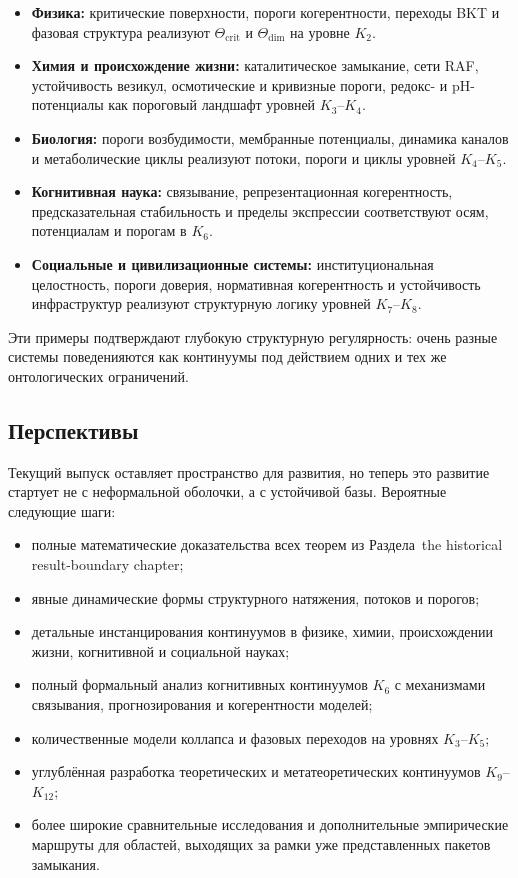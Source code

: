 \begin{itemize}
    \item \textbf{Физика:} критические поверхности, пороги когерентности, переходы BKT и
          фазовая структура реализуют \(\Theta_{\mathrm{crit}}\) и \(\Theta_{\mathrm{dim}}\)
          на уровне \(K_2\).
    \item \textbf{Химия и происхождение жизни:} каталитическое замыкание, сети RAF,
          устойчивость везикул, осмотические и кривизные пороги, редокс- и pH-потенциалы
          как пороговый ландшафт уровней \(K_3\)–\(K_4\).
    \item \textbf{Биология:} пороги возбудимости, мембранные потенциалы,
          динамика каналов и метаболические циклы реализуют потоки, пороги и циклы
          уровней \(K_4\)–\(K_5\).
    \item \textbf{Когнитивная наука:} связывание, репрезентационная когерентность,
          предсказательная стабильность и пределы экспрессии соответствуют осям,
          потенциалам и порогам в \(K_6\).
    \item \textbf{Социальные и цивилизационные системы:} институциональная целостность,
          пороги доверия, нормативная когерентность и устойчивость инфраструктур
          реализуют структурную логику уровней \(K_7\)–\(K_8\).
\end{itemize}

Эти примеры подтверждают глубокую структурную регулярность: очень разные системы
поведенияются как континуумы под действием одних и тех же онтологических ограничений.

\subsection{Перспективы}

Текущий выпуск оставляет пространство для развития, но теперь это развитие
стартует не с неформальной оболочки, а с устойчивой базы. Вероятные следующие шаги:

\begin{itemize}
    \item полные математические доказательства всех теорем из Раздела~the historical result-boundary chapter;
    \item явные динамические формы структурного натяжения, потоков и порогов;
    \item детальные инстанцирования континуумов в физике, химии, происхождении жизни,
          когнитивной и социальной науках;
    \item полный формальный анализ когнитивных континуумов \(K_6\) с механизмами
          связывания, прогнозирования и когерентности моделей;
    \item количественные модели коллапса и фазовых переходов на уровнях \(K_3\)–\(K_5\);
    \item углублённая разработка теоретических и метатеоретических континуумов
          \(K_9\)–\(K_{12}\);
    \item более широкие сравнительные исследования и дополнительные эмпирические
          маршруты для областей, выходящих за рамки уже представленных пакетов замыкания.
\end{itemize}

